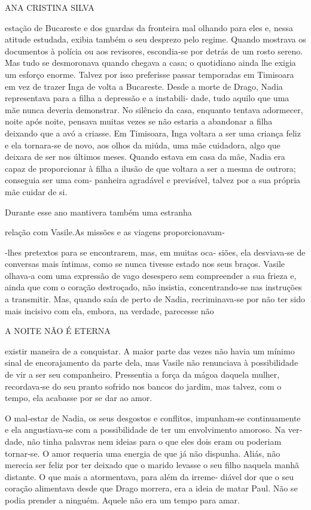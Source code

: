 ANA CRISTINA SILVA

estação de Bucareste e dos guardas da fronteira mal olhando para eles e,
nessa atitude estudada, exibia também o seu desprezo pelo regime. Quando
mostrava os documentos à polícia ou aos revisores, escondia‑se por
detrás de um rosto sereno. Mas tudo se desmoronava quando chegava a
casa; o quotidiano ainda lhe exigia um esforço enorme. Talvez por isso
preferisse passar temporadas em Timisoara em vez de trazer Inga de volta
a Bucareste. Desde a morte de Drago, Nadia representava para a filha a
depressão e a instabili‑ dade, tudo aquilo que uma mãe nunca deveria
demonstrar. No silêncio da casa, enquanto tentava adormecer, noite após
noite, pensava muitas vezes se não estaria a abandonar a filha deixando
que a avó a criasse. Em Timisoara, Inga voltara a ser uma criança feliz
e ela tornara‑se de novo, aos olhos da miúda, uma mãe cuidadora, algo
que deixara de ser nos últimos meses. Quando estava em casa da mãe,
Nadia era capaz de proporcionar à filha a ilusão de que voltara a ser a
mesma de outrora; conseguia ser uma com‑ panheira agradável e
previsível, talvez por a sua própria mãe cuidar de si.

Durante esse ano mantivera também uma estranha

relação com Vasile.As missões e as viagens proporcionavam‑

‑lhes pretextos para se encontrarem, mas, em muitas oca‑ siões, ela
desviava‑se de conversas mais íntimas, como se nunca tivesse estado nos
seus braços. Vasile olhava‑a com uma expressão de vago desespero sem
compreender a sua frieza e, ainda que com o coração destroçado, não
insistia, concentrando‑se nas instruções a transmitir. Mas, quando saía
de perto de Nadia, recriminava‑se por não ter sido mais incisivo com
ela, embora, na verdade, parecesse não

A NOITE NÃO É ETERNA

existir maneira de a conquistar. A maior parte das vezes não havia um
mínimo sinal de encorajamento da parte dela, mas Vasile não renunciava à
possibilidade de vir a ser seu companheiro. Pressentia a força da mágoa
daquela mulher, recordava‑se do seu pranto sofrido nos bancos do jardim,
mas talvez, com o tempo, ela acabasse por se dar ao amor.

O mal‑estar de Nadia, os seus desgostos e conflitos, impunham‑se
continuamente e ela angustiava‑se com a possibilidade de ter um
envolvimento amoroso. Na ver‑ dade, não tinha palavras nem ideias para o
que eles dois eram ou poderiam tornar‑se. O amor requeria uma energia de
que já não dispunha. Aliás, não merecia ser feliz por ter deixado que o
marido levasse o seu filho naquela manhã distante. O que mais a
atormentava, para além da irreme‑ diável dor que o seu coração
alimentava desde que Drago morrera, era a ideia de matar Paul. Não se
podia prender a ninguém. Aquele não era um tempo para amar.

